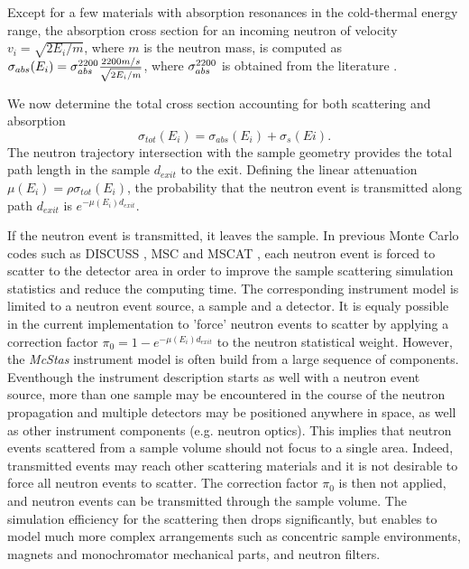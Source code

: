 Except for a few materials with absorption resonances in the cold-thermal energy range, the absorption cross section for an incoming neutron of velocity $v_i=\sqrt{2E_i/m}$, where $m$ is the neutron mass, is computed as
$\sigma_{abs}(E_i) = \sigma_{abs}^{{\rm 2200}}\frac{2200 m/s}{\sqrt{2E_i/m}}$, where $\sigma_{abs}^{{\rm 2200}}$ is obtained from the literature \cite{ILLblue}.

We now determine the total cross section accounting for both scattering and absorption
\begin{equation}
\sigma_{tot}(E_i) = \sigma_{abs}(E_i) + \sigma_s(Ei).
\end{equation}
The neutron trajectory intersection with the sample geometry provides the total path length in the sample $d_{exit}$ to the exit.
Defining the linear attenuation $\mu(E_i) = \rho\sigma_{tot}(E_i)$, the probability that the neutron event is transmitted along path $d_{exit}$ is $e^{-\mu(E_i) d_{exit}}$.

If the neutron event is transmitted, it leaves the sample. In previous Monte Carlo codes such as DISCUSS \cite{discus}, MSC \cite{msc} and MSCAT \cite{mscat}, each neutron event is forced to scatter to the detector area in order to improve the sample scattering simulation statistics and reduce the computing time. The corresponding instrument model is limited to a neutron event source, a sample and a detector. It is equaly possible in the current implementation to 'force' neutron events to scatter by applying a correction factor $\pi_0=1-e^{-\mu(E_i) d_{exit}}$ to the neutron statistical weight. However, the \emph{McStas} instrument model is often build from a large sequence of components. Eventhough the instrument description starts as well with a neutron event source, more than one sample may be encountered in the course of the neutron propagation and multiple detectors may be positioned anywhere in space, as well as other instrument components (e.g. neutron optics). This implies that neutron events scattered from a sample volume should not focus to a single area.  Indeed, transmitted events may reach other scattering materials and it is not desirable to force all neutron events to scatter. The correction factor $\pi_0$ is then not applied, and neutron events can be transmitted through the sample volume. The simulation efficiency for the scattering then drops significantly, but enables to model much more complex arrangements such as concentric sample environments, magnets and monochromator mechanical parts, and neutron filters.

